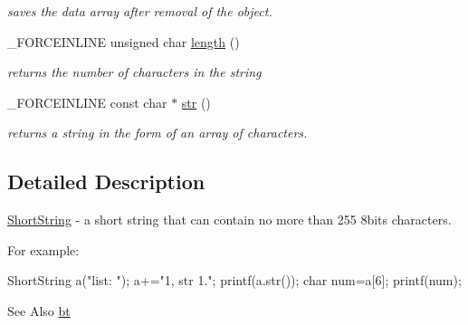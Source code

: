 \begin{DoxyCompactItemize}
\begin{DoxyCompactList}\small\item\em saves the data array after removal of the object. \end{DoxyCompactList}\item 
\hypertarget{classbt_1_1_short_string_a57783a8fa61c27ff1860937dc0d48110}{\-\_\-\-F\-O\-R\-C\-E\-I\-N\-L\-I\-N\-E unsigned char \hyperlink{classbt_1_1_short_string_a57783a8fa61c27ff1860937dc0d48110}{length} ()}\label{classbt_1_1_short_string_a57783a8fa61c27ff1860937dc0d48110}

\begin{DoxyCompactList}\small\item\em returns the number of characters in the string \end{DoxyCompactList}\item 
\hypertarget{classbt_1_1_short_string_ac165aea128f6d1efe23bb18f34e823de}{\-\_\-\-F\-O\-R\-C\-E\-I\-N\-L\-I\-N\-E const char $\ast$ \hyperlink{classbt_1_1_short_string_ac165aea128f6d1efe23bb18f34e823de}{str} ()}\label{classbt_1_1_short_string_ac165aea128f6d1efe23bb18f34e823de}

\begin{DoxyCompactList}\small\item\em returns a string in the form of an array of characters. \end{DoxyCompactList}\end{DoxyCompactItemize}


\subsection{Detailed Description}
\hyperlink{classbt_1_1_short_string}{Short\-String} -\/ a short string that can contain no more than 255 8bits characters. 

For example\-: \begin{DoxyVerb}  ShortString a("list: ");
  a+="1, str 1.";
  printf(a.str());
  char num=a[6];
  printf(num);
\end{DoxyVerb}


\begin{DoxySeeAlso}{See Also}
\hyperlink{namespacebt}{bt} 
\end{DoxySeeAlso}
